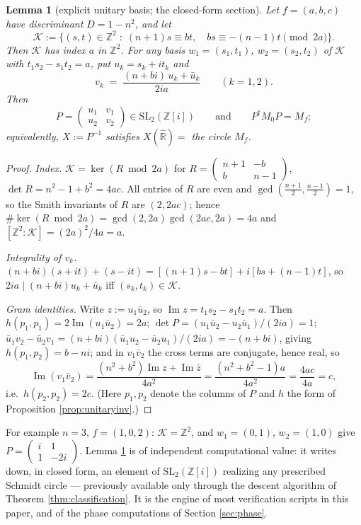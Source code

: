 \documentclass[11pt]{amsart}
\numberwithin{equation}{section}
\theoremstyle{plain}
\newtheorem{lemma}[theorem]{Lemma}
\theoremstyle{definition}
\theoremstyle{remark}
\newcommand{\R}{\mathbb{R}}
\newcommand{\Z}{\mathbb{Z}}
\newcommand{\Zi}{\Z[i]}
\newcommand{\Rhat}{\widehat{\R}}
\newcommand{\SL}{\mathrm{SL}}
\newcommand{\im}{\operatorname{Im}}
\begin{document}
\begin{lemma}[explicit unitary basis; the closed-form section]
\label{lem:lemmaA}
Let $f = (a, b, c)$ have discriminant $D = 1 - n^2$, and let
\[
  \mathcal{K} := \bigl\{(s, t) \in \Z^2 \;:\;
  (n+1)s \equiv bt, \quad bs \equiv -(n-1)t \pmod{2a}\bigr\}.
\]
Then $\mathcal{K}$ has index $a$ in $\Z^2$.  For any basis
$w_1 = (s_1, t_1)$, $w_2 = (s_2, t_2)$ of $\mathcal{K}$ with
$t_1s_2 - s_1t_2 = a$, put $u_k = s_k + it_k$ and
\[
  v_k \;=\; \frac{(n + bi)\,u_k + \bar u_k}{2ia} \qquad (k = 1, 2).
\]
Then
\[
  P = \begin{pmatrix} u_1 & v_1 \\ u_2 & v_2 \end{pmatrix}
  \in \SL_2(\Zi)
  \qquad\text{and}\qquad
  P^{\dagger} M_0 P = M_f;
\]
equivalently, $X := P^{-1}$ satisfies $X(\Rhat) = $ the circle $M_f$.
\end{lemma}

\begin{proof}
\emph{Index.}  $\mathcal{K} = \ker(R \bmod 2a)$ for
$R = \begin{pmatrix} n+1 & -b \\ b & n-1\end{pmatrix}$,
$\det R = n^2 - 1 + b^2 = 4ac$.  All entries of $R$ are even and
$\gcd(\tfrac{n+1}{2}, \tfrac{n-1}{2}) = 1$, so the Smith invariants of
$R$ are $(2, 2ac)$; hence
$\#\ker(R \bmod 2a) = \gcd(2, 2a)\gcd(2ac, 2a) = 4a$ and
$[\Z^2 : \mathcal{K}] = (2a)^2/4a = a$.

\emph{Integrality of $v_k$.}
$(n + bi)(s + it) + (s - it) = [(n+1)s - bt] + i[bs + (n-1)t]$, so
$2ia \mid (n + bi)u_k + \bar u_k$ iff $(s_k, t_k) \in \mathcal{K}$.

\emph{Gram identities.}  Write $z := u_1\bar u_2$, so
$\im z = t_1s_2 - s_1t_2 = a$.  Then $h(p_1, p_1) = 2\im(u_1\bar u_2)
= 2a$;
$\det P = (u_1\bar u_2 - u_2\bar u_1)/(2ia) = 1$;
$\bar u_1v_2 - \bar u_2v_1 = (n + bi)(\bar u_1u_2 - \bar
u_2u_1)/(2ia) = -(n + bi)$, giving $h(p_1, p_2) = b - ni$; and in
$v_1\bar v_2$ the cross terms are conjugate, hence real, so
\[
  \im(v_1\bar v_2)
  = \frac{(n^2 + b^2)\im z + \im\bar z}{4a^2}
  = \frac{(n^2 + b^2 - 1)a}{4a^2} = \frac{4ac}{4a} = c,
\]
i.e.\ $h(p_2, p_2) = 2c$.  (Here $p_1, p_2$ denote the columns of
$P$ and $h$ the form of Proposition \ref{prop:unitaryinv}.)
\end{proof}

For example $n = 3$, $f = (1, 0, 2)$: $\mathcal{K} = \Z^2$, and
$w_1 = (0, 1)$, $w_2 = (1, 0)$ give
$P = \begin{pmatrix} i & 1 \\ 1 & -2i\end{pmatrix}$.  Lemma
\ref{lem:lemmaA} is of independent computational value: it writes down,
in closed form, an element of $\SL_2(\Zi)$ realizing any prescribed
Schmidt circle --- previously available only through the descent
algorithm of Theorem \ref{thm:classification}.  It is the engine of
most verification scripts in this paper, and of the phase computations
of Section \ref{sec:phase}.
\end{document}
